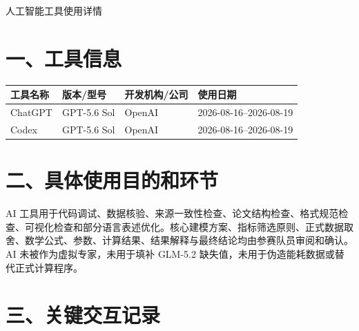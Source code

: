 \documentclass[UTF8,zihao=-4,a4paper]{ctexart}
\begin{document}
\begin{center}
{\heiti{} 人工智能工具使用详情}
\end{center}

\section*{一、工具信息}
\begingroup\small\setlength{\tabcolsep}{3pt}
\noindent\begin{tabularx}{\textwidth}{p{2.3cm}p{3.0cm}p{3.0cm}Y}
\toprule
工具名称 & 版本/型号 & 开发机构/公司 & 使用日期 \\
\midrule
ChatGPT & GPT-5.6 Sol & OpenAI & 2026-08-16--2026-08-19 \\
Codex & GPT-5.6 Sol & OpenAI & 2026-08-16--2026-08-19 \\
\bottomrule
\end{tabularx}
\endgroup

\section*{二、具体使用目的和环节}
AI 工具用于代码调试、数据核验、来源一致性检查、论文结构检查、格式规范检查、可视化检查和部分语言表述优化。核心建模方案、指标筛选原则、正式数据取舍、数学公式、参数、计算结果、结果解释与最终结论均由参赛队员审阅和确认。AI 未被作为虚拟专家，未用于填补 GLM-5.2 缺失值，未用于伪造能耗数据或替代正式计算程序。

\section*{三、关键交互记录}
\end{document}
